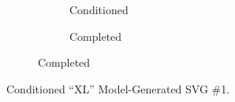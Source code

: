 \documentclass[11pt]{article}
\begin{document}
\begin{figure}[htbp]
\begin{minipage}[t]{.48\linewidth}
	\end{minipage}
	\hfill
	\begin{subfigure}[b]{\linewidth}
		\centering
		\begin{subfigure}[b]{.4\textwidth}
			\centering
			
			\caption{Conditioned}
		\end{subfigure}
		\begin{subfigure}[b]{.4\textwidth}
			\centering
			
			\caption{Completed}
		\end{subfigure}
	\end{subfigure}

	\caption{Conditioned ``XL'' Model-Generated SVG \#1.}
	\label{Conditioned_0}
\end{figure}
\end{document}
